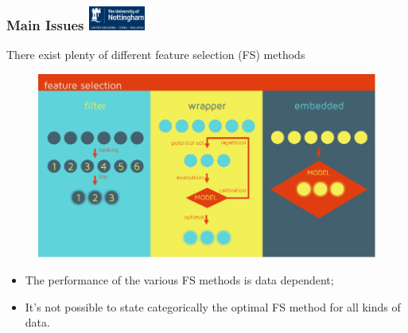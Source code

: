 \documentclass[aspectratio=1610]{beamer}
\newcommand{\UoN}
  {\hfill {\includegraphics[height=0.8cm]{nott_logo/nott_logo_white.png}}}
\begin{document}
\begin{frame}
\frametitle{Main Issues \UoN}
	There exist plenty of different feature selection (FS) methods

	\begin{figure}
	\includegraphics[scale=0.4]{Figures/FS_Methods.png}
	\end{figure}

	\begin{itemize}
		\item The performance of the various FS methods is data dependent;
		\item It's not possible to state categorically the optimal FS method for all kinds of data.
	\end{itemize}

\end{frame}
\end{document}
